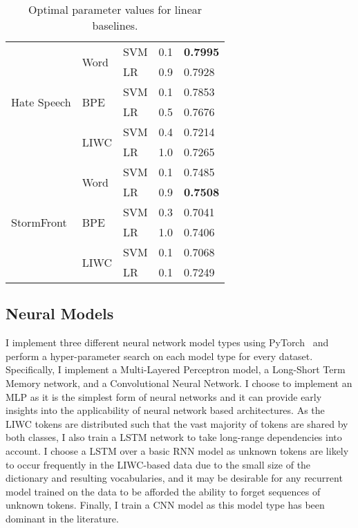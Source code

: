 \begin{table}[]
{\begin{tabular}{lllll}
\multirow{6}{*}{Hate Speech} & \multirow{2}{*}{Word} & SVM   & 0.1 & \textbf{0.7995}     \\
                             &                       & LR    & 0.9 & 0.7928              \\
                             & \multirow{2}{*}{BPE}  & SVM   & 0.1 & 0.7853              \\
                             &                       & LR    & 0.5 & 0.7676              \\
                             & \multirow{2}{*}{LIWC} & SVM   & 0.4 & 0.7214              \\
                             &                       & LR    & 1.0 & 0.7265              \\\hline
\multirow{6}{*}{StormFront}  & \multirow{2}{*}{Word} & SVM   & 0.1 & 0.7485              \\
                             &                       & LR    & 0.9 & \textbf{0.7508}     \\
                             & \multirow{2}{*}{BPE}  & SVM   & 0.3 & 0.7041              \\
                             &                       & LR    & 1.0 & 0.7406              \\
                             & \multirow{2}{*}{LIWC} & SVM   & 0.1 & 0.7068              \\
                             &                       & LR    & 0.1 & 0.7249             
\end{tabular}%
}
\caption{Optimal parameter values for linear baselines.}
\label{tab:liwc_baseline_linear_params}
\end{table}


\subsection{Neural Models}\label{sec:redux_neural}

I implement three different neural network model types using PyTorch~\citep{Paszke:2019} and perform a hyper-parameter search on each model type for every dataset. Specifically, I implement a Multi-Layered Perceptron model, a Long-Short Term Memory network, and a Convolutional Neural Network.
I choose to implement an MLP as it is the simplest form of neural networks and it can provide early insights into the applicability of neural network based architectures.
As the LIWC tokens are distributed such that the vast majority of tokens are shared by both classes, I also train a LSTM network to take long-range dependencies into account. I choose a LSTM over a basic RNN model as unknown tokens are likely to occur frequently in the LIWC-based data due to the small size of the dictionary and resulting vocabularies, and it may be desirable for any recurrent model trained on the data to be afforded the ability to forget sequences of unknown tokens.
Finally, I train a CNN model as this model type has been dominant in the literature.

